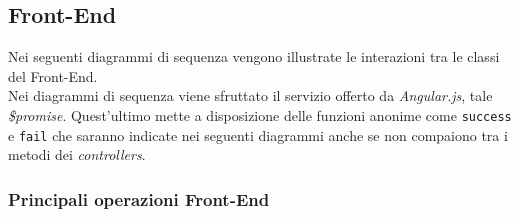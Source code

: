 \subsection{Front-End}
Nei seguenti diagrammi di sequenza vengono illustrate le interazioni tra le classi del Front-End. \\
Nei diagrammi di sequenza viene sfruttato il servizio offerto da \textit{Angular.js}, tale  \textit{\$promise}. Quest'ultimo mette a disposizione delle funzioni anonime come \texttt{success} e \texttt{fail} che saranno indicate nei seguenti diagrammi anche se non compaiono tra i metodi dei \textit{controllers}.
\subsubsection{Principali operazioni Front-End}